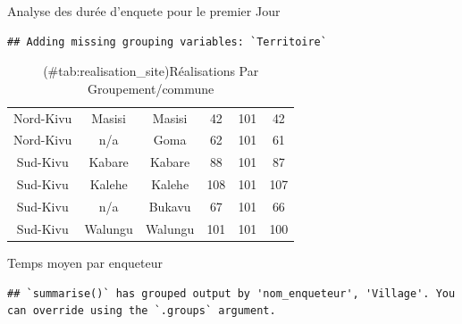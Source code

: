 \documentclass[
]{book}
\begin{document}
Analyse des durée d'enquete pour le premier Jour

\begin{verbatim}
## Adding missing grouping variables: `Territoire`
\end{verbatim}

\begin{table}

\caption{(\#tab:realisation_site)Réalisations Par Groupement/commune }
\centering
\begin{tabular}[t]{c|c|c|c|c|c}
\hline
\cellcolor{blue}{Province} & \cellcolor{blue}{Territoire} & \cellcolor{blue}{Territoire\_Commune} & \cellcolor{blue}{n} & \cellcolor{blue}{assignation} & \cellcolor{blue}{Pourcentage}\\
\hline
Nord-Kivu & Masisi & Masisi & 42 & 101 & 42\\
\hline
Nord-Kivu & n/a & Goma & 62 & 101 & 61\\
\hline
Sud-Kivu & Kabare & Kabare & 88 & 101 & 87\\
\hline
Sud-Kivu & Kalehe & Kalehe & 108 & 101 & 107\\
\hline
Sud-Kivu & n/a & Bukavu & 67 & 101 & 66\\
\hline
Sud-Kivu & Walungu & Walungu & 101 & 101 & 100\\
\hline
\end{tabular}
\end{table}

Temps moyen par enqueteur

\begin{verbatim}
## `summarise()` has grouped output by 'nom_enqueteur', 'Village'. You can override using the `.groups` argument.
\end{verbatim}
\end{document}
